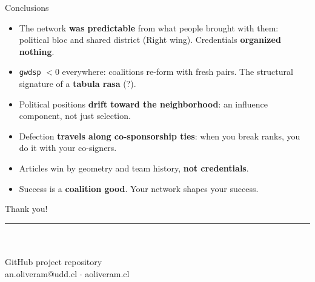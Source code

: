 \documentclass[aspectratio=169,11pt]{beamer}
\newcommand{\emphr}[1]{{\color{ndreddark}\textbf{#1}}}
\begin{document}
\begin{frame}{Conclusions}
\begin{itemize}
  \item The network \emphr{was predictable} from what people brought with them: political bloc and shared district (Right wing). Credentials \emphr{organized nothing}.
  \vspace{0.2cm}
  \item \texttt{gwdsp} $< 0$ everywhere: coalitions re-form with fresh pairs. The structural signature of a \emphr{tabula rasa} (?).
  \vspace{0.2cm}
  \item Political positions \emphr{drift toward the neighborhood}: an influence component, not just selection.
  \vspace{0.2cm}
  \item Defection \emphr{travels along co-sponsorship ties}: when you break ranks, you do it with your co-signers.
  \vspace{0.2cm}
  \item Articles win by geometry and team history, \emphr{not credentials}.
  \vspace{0.2cm}
  \item Success is a \emphr{coalition good}. Your network shapes your success.
\end{itemize}
\end{frame}

\begin{frame}[plain]
  \vfill
  \begin{center}
    {\Large Thank you!}\\[2pt]
    {\color{ndred}\rule{0.22\textwidth}{1.1pt}}\\[0.8cm]
    \\[0.35cm]
    {\small GitHub project repository}\\[0.5cm]
    {\small\color{ndgray} an.oliveram@udd.cl $\cdot$ aoliveram.cl}
  \end{center}
  \vfill
\end{frame}
\end{document}
